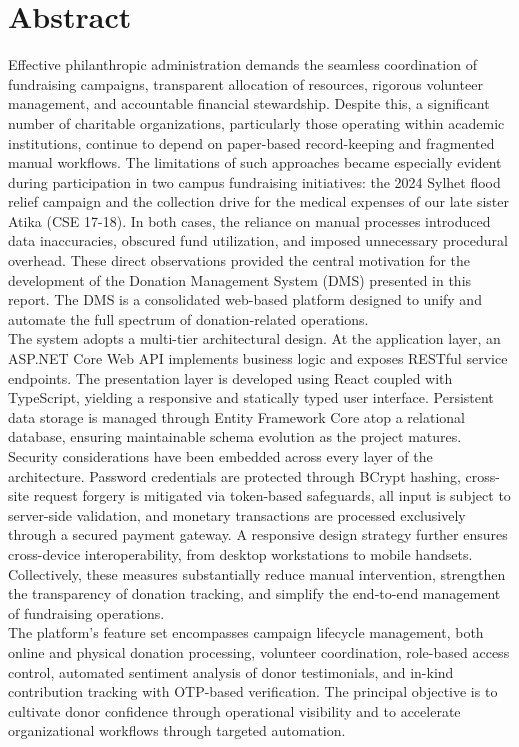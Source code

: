 \documentclass{thesis-library}
\begin{document}
\chapter*{Abstract}
Effective philanthropic administration demands the seamless coordination of fundraising campaigns, transparent allocation of resources, rigorous volunteer management, and accountable financial stewardship. Despite this, a significant number of charitable organizations, particularly those operating within academic institutions, continue to depend on paper-based record-keeping and fragmented manual workflows. The limitations of such approaches became especially evident during participation in two campus fundraising initiatives: the 2024 Sylhet flood relief campaign and the collection drive for the medical expenses of our late sister Atika (CSE 17-18). In both cases, the reliance on manual processes introduced data inaccuracies, obscured fund utilization, and imposed unnecessary procedural overhead. These direct observations provided the central motivation for the development of the Donation Management System (DMS) presented in this report. The DMS is a consolidated web-based platform designed to unify and automate the full spectrum of donation-related operations.
\\
The system adopts a multi-tier architectural design. At the application layer, an ASP.NET Core Web API implements business logic and exposes RESTful service endpoints. The presentation layer is developed using React coupled with TypeScript, yielding a responsive and statically typed user interface. Persistent data storage is managed through Entity Framework Core atop a relational database, ensuring maintainable schema evolution as the project matures.
\\
Security considerations have been embedded across every layer of the architecture. Password credentials are protected through BCrypt hashing, cross-site request forgery is mitigated via token-based safeguards, all input is subject to server-side validation, and monetary transactions are processed exclusively through a secured payment gateway. A responsive design strategy further ensures cross-device interoperability, from desktop workstations to mobile handsets. Collectively, these measures substantially reduce manual intervention, strengthen the transparency of donation tracking, and simplify the end-to-end management of fundraising operations.
\\
The platform's feature set encompasses campaign lifecycle management, both online and physical donation processing, volunteer coordination, role-based access control, automated sentiment analysis of donor testimonials, and in-kind contribution tracking with OTP-based verification. The principal objective is to cultivate donor confidence through operational visibility and to accelerate organizational workflows through targeted automation.
\end{document}
